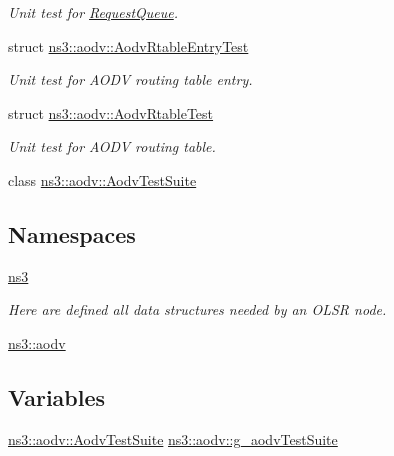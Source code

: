 \begin{DoxyCompactItemize}
\begin{DoxyCompactList}\small\item\em Unit test for \hyperlink{classns3_1_1aodv_1_1RequestQueue}{Request\+Queue}. \end{DoxyCompactList}\item 
struct \hyperlink{structns3_1_1aodv_1_1AodvRtableEntryTest}{ns3\+::aodv\+::\+Aodv\+Rtable\+Entry\+Test}
\begin{DoxyCompactList}\small\item\em Unit test for A\+O\+DV routing table entry. \end{DoxyCompactList}\item 
struct \hyperlink{structns3_1_1aodv_1_1AodvRtableTest}{ns3\+::aodv\+::\+Aodv\+Rtable\+Test}
\begin{DoxyCompactList}\small\item\em Unit test for A\+O\+DV routing table. \end{DoxyCompactList}\item 
class \hyperlink{classns3_1_1aodv_1_1AodvTestSuite}{ns3\+::aodv\+::\+Aodv\+Test\+Suite}
\end{DoxyCompactItemize}
\subsection*{Namespaces}
\begin{DoxyCompactItemize}
\item 
 \hyperlink{namespacens3}{ns3}
\begin{DoxyCompactList}\small\item\em Here are defined all data structures needed by an O\+L\+SR node. \end{DoxyCompactList}\item 
 \hyperlink{namespacens3_1_1aodv}{ns3\+::aodv}
\end{DoxyCompactItemize}
\subsection*{Variables}
\begin{DoxyCompactItemize}
\item 
\hyperlink{classns3_1_1aodv_1_1AodvTestSuite}{ns3\+::aodv\+::\+Aodv\+Test\+Suite} \hyperlink{namespacens3_1_1aodv_a6bdcb01d640e6db83a090372c96ed015}{ns3\+::aodv\+::g\+\_\+aodv\+Test\+Suite}
\end{DoxyCompactItemize}
